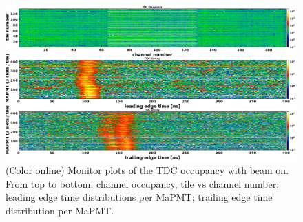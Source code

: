\documentclass[5p,times,twocolumn]{elsarticle}
\begin{document}
\begin{figure}[t]
\begin{center}
\includegraphics[width=1.0\columnwidth]{TDC_BeamOn.png}
\end{center}
\caption{(Color online) Monitor plots of the TDC occupancy with beam on. From top to bottom: channel occupancy, tile vs channel number; leading edge time distributions per MaPMT; trailing edge time distribution per MaPMT.}
\label{fig:Online_TDC}
\end{figure}




\end{document}
